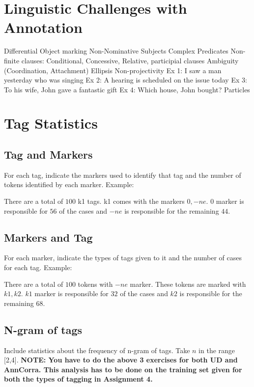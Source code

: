 \documentclass[a4 paper]{article}
\begin{document}
\section{Linguistic Challenges with Annotation}

 Differential Object marking
 Non-Nominative Subjects
 Complex Predicates
 Non-finite clauses: Conditional, Concessive, Relative, participial clauses
 Ambiguity (Coordination, Attachment)
 Ellipsis
 Non-projectivity
	Ex 1: I saw a man yesterday who was singing
	Ex 2: A hearing is scheduled on the issue today
	Ex 3: To his wife, John gave a fantastic gift
	Ex 4: Which house, John bought?
 Particles

\section{Tag Statistics}

\subsection{Tag and Markers}

For each tag, indicate the markers used to identify that tag and the number of tokens identified by each marker. Example:

There are a total of $100$ k1 tags. k1 comes with the markers $0, -ne$. $0$ marker is responsible for $56$ of the cases and $-ne$ is responsible for the remaining $44$.

\subsection{Markers and Tag}

For each marker, indicate the types of tags given to it and the number of cases for each tag. Example:

There are a total of $100$ tokens with $-ne$ marker. These tokens are marked with $k1, k2$. $k1$ marker is responsible for $32$ of the cases and $k2$ is responsible for the remaining $68$.

\subsection{N-gram of tags}
Include statistics about the frequency of n-gram of tags. Take $n$ in the range [2,4].
\newline \newline \newline
\textbf{NOTE: You have to do the above 3 exercises for both UD and AnnCorra. This analysis has to be done on the training set given for both the types of tagging in Assignment 4.}
\end{document}

